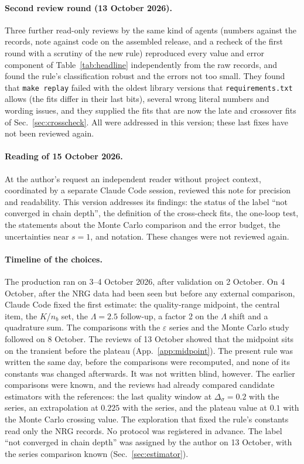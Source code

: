 \documentclass[10pt,a4paper]{article}
\newcommand{\Ds}{\Delta_\sigma}
\newcommand{\code}[1]{\texttt{#1}}
\begin{document}
\paragraph{Second review round (13 October 2026).} Three further read-only reviews by the same kind of agents (numbers against the
records, note against code on the assembled release, and a recheck of the first round with a scrutiny of the new rule) reproduced
every value and error component of Table~\ref{tab:headline} independently from the raw records, and found the rule's classification
robust and the errors not too small. They found that \code{make replay} failed with the oldest library versions that
\code{requirements.txt} allows (the fits differ in their last bits), several wrong literal numbers and wording issues, and they
supplied the fits that are now the late and crossover fits of Sec.~\ref{sec:crosscheck}. All were addressed in this version; these
last fixes have not been reviewed again.

\paragraph{Reading of 15 October 2026.} At the author's request an independent reader without project context, coordinated by a
separate Claude Code session, reviewed this note for precision and readability. This version addresses its findings: the status of
the label ``not converged in chain depth'', the definition of the cross-check fits, the one-loop test, the statements about the
Monte Carlo comparison and the error budget, the uncertainties near $s=1$, and notation. These changes were not reviewed again.

\paragraph{Timeline of the choices.} The production ran on 3--4 October 2026, after validation on 2 October. On 4 October, after the
NRG data had been seen but before any external comparison, Claude Code fixed the first estimate: the quality-range midpoint, the
central item, the $K$/$n_b$ set, the $\Lambda=2.5$ follow-up, a factor 2 on the $\Lambda$ shift and a quadrature sum. The comparisons
with the $\varepsilon$ series and the Monte Carlo study followed on 8 October. The reviews of 13 October showed that the midpoint sits
on the transient before the plateau (App.~\ref{app:midpoint}). The present rule was written the same day, before the comparisons were
recomputed, and none of its constants was changed afterwards. It was not written blind, however. The earlier comparisons were known,
and the reviews had already compared candidate estimators with the references: the last quality window at $\Ds=0.2$ with the series,
an extrapolation at $0.225$ with the series, and the plateau value at $0.1$ with the Monte Carlo crossing value. The exploration that
fixed the rule's constants read only the NRG records. No protocol was registered in advance. The label ``not converged in chain depth''
was assigned by the author on 13 October, with the series comparison known (Sec.~\ref{sec:estimator}).
\end{document}

